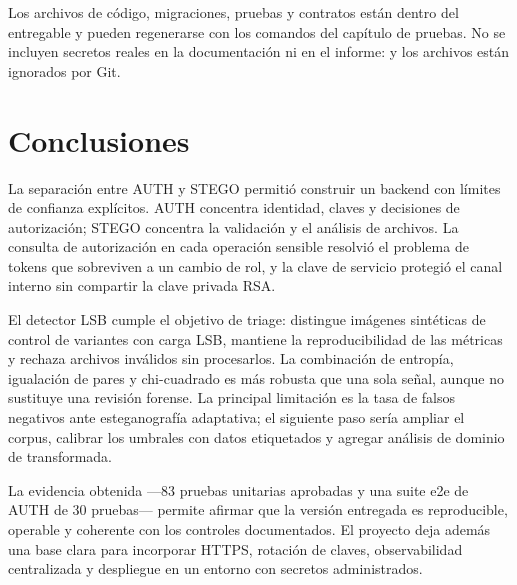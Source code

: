 \documentclass[11pt,a4paper]{article}
\newcommand{\code}[1]{\texttt{\detokenize{#1}}}
\begin{document}
\begin{resultbox}[Trazabilidad]
Los archivos de código, migraciones, pruebas y contratos están dentro del entregable
y pueden regenerarse con los comandos del capítulo de pruebas. No se incluyen
secretos reales en la documentación ni en el informe: \code{.env} y los archivos
\code{*.pem} están ignorados por Git.
\end{resultbox}


\section{Conclusiones}

La separación entre AUTH y STEGO permitió construir un backend con límites de
confianza explícitos. AUTH concentra identidad, claves y decisiones de autorización;
STEGO concentra la validación y el análisis de archivos. La consulta de autorización
en cada operación sensible resolvió el problema de tokens que sobreviven a un cambio
de rol, y la clave de servicio protegió el canal interno sin compartir la clave
privada RSA.

El detector LSB cumple el objetivo de triage: distingue imágenes sintéticas de
control de variantes con carga LSB, mantiene la reproducibilidad de las métricas y
rechaza archivos inválidos sin procesarlos. La combinación de entropía, igualación de
pares y chi-cuadrado es más robusta que una sola señal, aunque no sustituye una
revisión forense. La principal limitación es la tasa de falsos negativos ante
esteganografía adaptativa; el siguiente paso sería ampliar el corpus, calibrar los
umbrales con datos etiquetados y agregar análisis de dominio de transformada.

La evidencia obtenida ---83 pruebas unitarias aprobadas y una suite e2e de AUTH de 30
pruebas--- permite afirmar que la versión entregada es reproducible, operable y
coherente con los controles documentados. El proyecto deja además una base clara para
incorporar HTTPS, rotación de claves, observabilidad centralizada y despliegue en un
entorno con secretos administrados.

\end{document}
